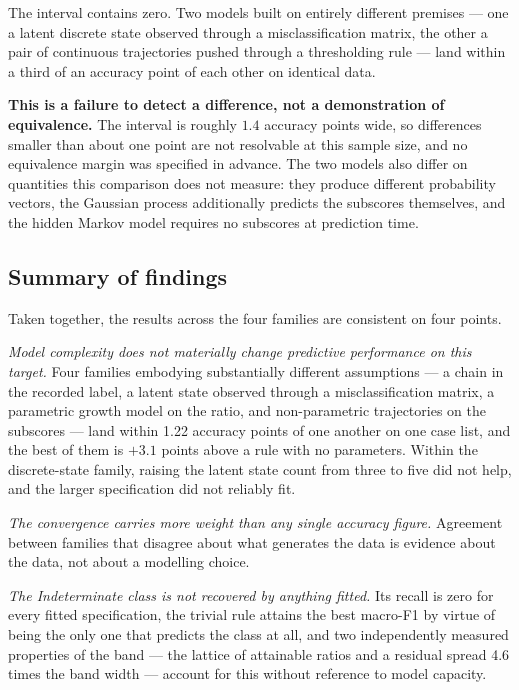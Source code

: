 \documentclass[11pt]{article}
\begin{document}
The interval contains zero. Two models built on entirely different premises ---
one a latent discrete state observed through a misclassification matrix, the
other a pair of continuous trajectories pushed through a thresholding rule ---
land within a third of an accuracy point of each other on identical data.

\textbf{This is a failure to detect a difference, not a demonstration of
equivalence.} The interval is roughly $1.4$ accuracy points wide, so differences
smaller than about one point are not resolvable at this sample size, and no
equivalence margin was specified in advance. The two models also differ on
quantities this comparison does not measure: they produce different probability
vectors, the Gaussian process additionally predicts the subscores themselves,
and the hidden Markov model requires no subscores at prediction time.

\subsection{Summary of findings}

Taken together, the results across the four families are consistent on four
points.

\emph{Model complexity does not materially change predictive performance on this
target.} Four families embodying substantially different assumptions --- a chain
in the recorded label, a latent state observed through a misclassification
matrix, a parametric growth model on the ratio, and non-parametric trajectories
on the subscores --- land within 1.22 accuracy points of one another on one case
list, and the best of them is $+3.1$ points above a rule with no parameters.
Within the discrete-state family, raising the latent state count from three to
five did not help, and the larger specification did not reliably fit.

\emph{The convergence carries more weight than any single accuracy figure.}
Agreement between families that disagree about what generates the data is
evidence about the data, not about a modelling choice.

\emph{The Indeterminate class is not recovered by anything fitted.} Its recall
is zero for every fitted specification, the trivial rule attains the best
macro-F1 by virtue of being the only one that predicts the class at all, and two
independently measured properties of the band --- the lattice of attainable
ratios and a residual spread 4.6 times the band width --- account for this
without reference to model capacity.
\end{document}
